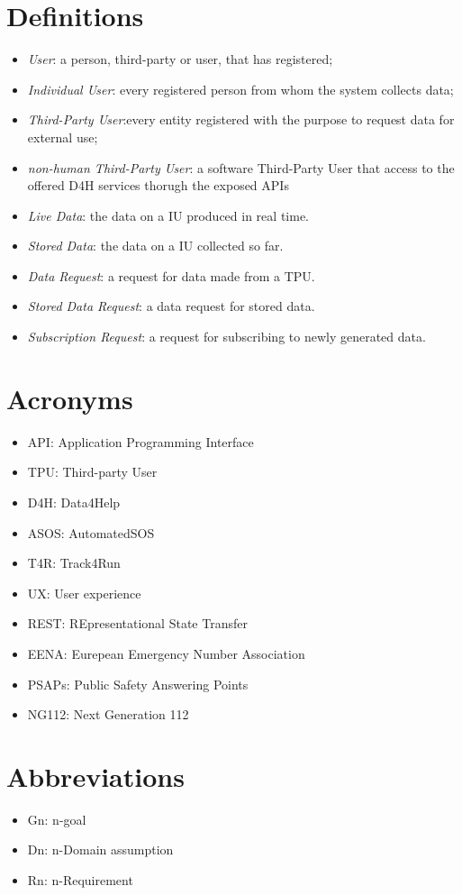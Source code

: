 \section{Definitions}
\begin{itemize}
\item \textit{User}: a person, third-party or user, that has registered;
\item \textit{Individual User}: every registered person from whom the system collects data; 
\item \textit{Third-Party User}:every entity registered with the purpose to request data for external use;
\item \textit{non-human Third-Party User}: a software Third-Party User that access to the offered D4H services thorugh the exposed APIs
\item \textit{Live Data}: the data on a IU produced in real time.
\item \textit{Stored Data}: the data on a IU collected so far.
\item \textit{Data Request}: a request for data made from a TPU.
\item \textit{Stored Data Request}: a data request for stored data.
\item \textit{Subscription Request}: a request for subscribing to newly generated data.
\end{itemize}
\section{Acronyms}
\begin{itemize}
\item API: Application Programming Interface
\item TPU: Third-party User
\item	D4H: Data4Help
\item	ASOS: AutomatedSOS
\item T4R: Track4Run
\item UX: User experience
\item REST: REpresentational State Transfer
\item EENA: Eurepean Emergency Number Association
\item PSAPs: Public Safety Answering Points
\item NG112: Next Generation 112
\end{itemize}

\section{Abbreviations}
\begin{itemize}
\item Gn: n-goal
\item Dn: n-Domain assumption
\item Rn: n-Requirement
\end{itemize}

